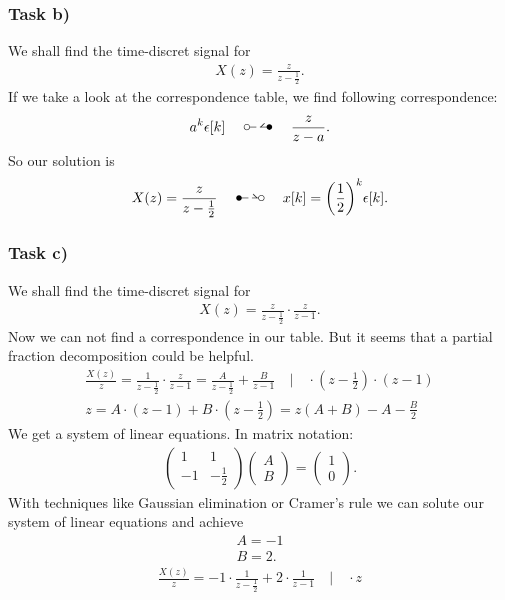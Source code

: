 \subsubsection{Task b)}
We shall find the time-discret signal for
\begin{align}
	X(z)=\frac{z}{z-\frac{1}{2}}.
\end{align}
If we take a look at the correspondence table, we find following correspondence:
\begin{align}
	\label{eq:GeometricProgression}
	a^k\epsilon[k]\quad\ztransf\quad\frac{z}{z-a}.
\end{align}
So our solution is
\begin{align}
	X(z)=\frac{z}{z-\frac{1}{2}}\quad\Ztransf\quad x[k]=\bigg (\frac{1}{2}\bigg)^k\epsilon[k].
\end{align}
\subsubsection{Task c)}
We shall find the time-discret signal for
\begin{align}
	X(z)=\frac{z}{z-\frac{1}{2}}\cdot\frac{z}{z-1}.
\end{align}
Now we can not find a correspondence in our table. But it seems that a partial fraction decomposition could be helpful.
\begin{align}
	\frac{X(z)}{z}=\frac{1}{z-\frac{1}{2}}\cdot\frac{z}{z-1}=\frac{A}{z-\frac{1}{2}}+\frac{B}{z-1} \quad \Bigg | \quad\cdot (z-\frac{1}{2})\cdot(z-1)\nonumber\\
	z=A\cdot(z-1)+B\cdot(z-\frac{1}{2})=z(A+B)-A-\frac{B}{2}
\end{align}
We get a system of linear equations. In matrix notation:
\begin{align}
	\begin{pmatrix}
		1 & 1\\
		-1 & -\frac{1}{2}
	\end{pmatrix}
	\begin{pmatrix}
		A \\
		B
	\end{pmatrix}
	=
	\begin{pmatrix}
		1 \\
		0
	\end{pmatrix}.
\end{align}
With techniques like Gaussian elimination or Cramer's rule we can solute our system of linear equations and achieve
\begin{align}
	A = -1 \nonumber \\
	B = 2.
\end{align}
\begin{align}
	\frac{X(z)}{z}=-1\cdot\frac{1}{z-\frac{1}{2}}+2\cdot\frac{1}{z-1} \quad\Bigg | \quad \cdot z
\end{align}


